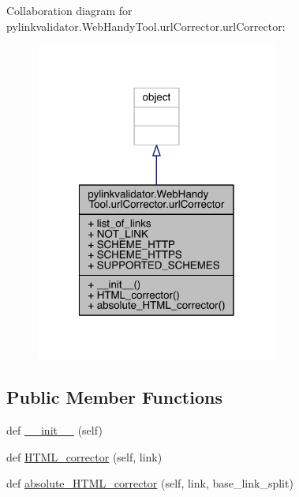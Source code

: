 Collaboration diagram for pylinkvalidator.\+Web\+Handy\+Tool.\+url\+Corrector.\+url\+Corrector\+:
\nopagebreak
\begin{figure}[H]
\begin{center}
\leavevmode
\includegraphics[width=226pt]{classpylinkvalidator_1_1_web_handy_tool_1_1url_corrector_1_1url_corrector__coll__graph}
\end{center}
\end{figure}
\subsection*{Public Member Functions}
\begin{DoxyCompactItemize}
\item 
def \hyperlink{classpylinkvalidator_1_1_web_handy_tool_1_1url_corrector_1_1url_corrector_a74c7cfee65534308bc6ed2ff2731d87a}{\+\_\+\+\_\+init\+\_\+\+\_\+} (self)
\item 
def \hyperlink{classpylinkvalidator_1_1_web_handy_tool_1_1url_corrector_1_1url_corrector_a5779046db561bf9a2716aa3189af838b}{H\+T\+M\+L\+\_\+corrector} (self, link)
\item 
def \hyperlink{classpylinkvalidator_1_1_web_handy_tool_1_1url_corrector_1_1url_corrector_a4c652295a197e0cb7a967628c627d441}{absolute\+\_\+\+H\+T\+M\+L\+\_\+corrector} (self, link, base\+\_\+link\+\_\+split)
\end{DoxyCompactItemize}
